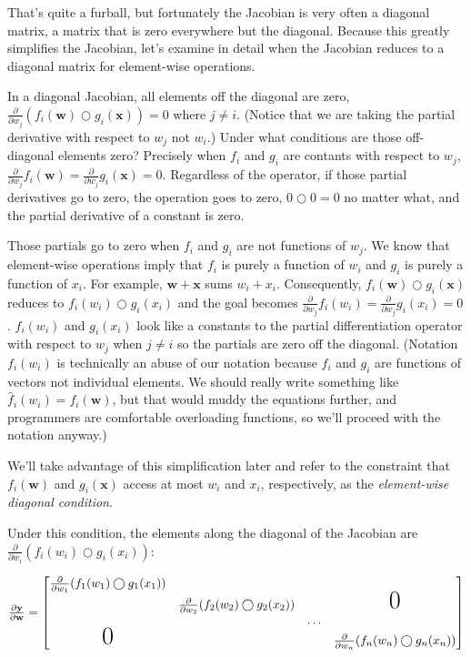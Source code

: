 \documentclass[11pt]{article}
\begin{document}
That's quite a furball, but fortunately the Jacobian is very often a diagonal matrix, a matrix that is zero everywhere but the diagonal. Because this greatly simplifies the Jacobian, let's examine in detail when the Jacobian reduces to a diagonal matrix for element-wise operations. 

In a diagonal Jacobian, all elements off the diagonal are zero, $\frac{\partial}{\partial w_j} ( f_i(\mathbf{w}) \bigcirc g_i(\mathbf{x}) ) = 0$ where $j \neq i$. (Notice that we are taking the partial derivative with respect to $w_j$ not $w_i$.) Under what conditions are those off-diagonal elements zero? Precisely when $f_i$ and $g_i$ are contants with respect to $w_j$, $\frac{\partial}{\partial w_j} f_i(\mathbf{w}) = \frac{\partial}{\partial w_j} g_i(\mathbf{x}) = 0$.  Regardless of the operator, if those partial derivatives go to zero, the operation goes to zero, $0 \bigcirc 0 = 0$ no matter what, and the partial derivative of a constant is zero.

Those partials go to zero when $f_i$ and $g_i$ are not functions of $w_j$. We know that element-wise operations imply that $f_i$ is purely a function of $w_i$ and $g_i$  is purely a function of $x_i$. For example, $\mathbf{w}+\mathbf{x}$ sums $w_i + x_i$. Consequently,  $f_i(\mathbf{w}) \bigcirc g_i(\mathbf{x})$ reduces to $f_i(w_i) \bigcirc g_i(x_i)$ and the goal becomes $\frac{\partial}{\partial w_j} f_i(w_i) = \frac{\partial}{\partial w_j} g_i(x_i) = 0$. $f_i(w_i)$ and $g_i(x_i)$ look like a constants to the partial differentiation operator with respect to $w_j$ when $j \neq i$ so the partials are zero off the diagonal. (Notation $f_i(w_i)$ is technically an abuse of our notation because $f_i$ and $g_i$ are functions of vectors not individual elements. We should really write something like $\hat f_{i}(w_i) = f_{i}(\mathbf{w})$, but that would muddy the equations further, and programmers are comfortable overloading functions, so we'll proceed with the notation anyway.)  

We'll take advantage of this simplification later and refer to the constraint that $f_i(\mathbf{w})$ and $g_i(\mathbf{x})$ access at most $w_i$ and $x_i$, respectively, as the {\em element-wise diagonal condition}.

Under this condition, the elements along the diagonal of the Jacobian are $\frac{\partial}{\partial w_i} ( f_i(w_i) \bigcirc g_i(x_i) )$:

$
\frac{\partial \mathbf{y}}{\partial \mathbf{w}}  = \begin{bmatrix}
\frac{\partial}{\partial w_1} ( f_{1}(w_1) \bigcirc g_{1}(x_1) )\\
& \frac{\partial}{\partial w_2} (f_{2}(w_2) \bigcirc g_{2}(x_2) ) & &\text{\huge0}\\
& & \ldots \\
\text{\huge0}& & & \frac{\partial}{\partial w_n} (f_{n}(w_n) \bigcirc g_{n}(x_n) )
\end{bmatrix}
$
\end{document}
